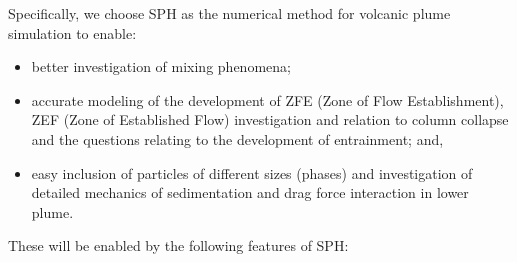 \documentclass[journal abbreviation, manuscript]{copernicus}
\begin{document}
Specifically, we choose SPH as the numerical method for volcanic plume simulation to enable:
\begin{itemize}
\item better investigation of mixing phenomena;
\item accurate modeling of the development of ZFE (Zone of Flow Establishment), ZEF (Zone of Established Flow) investigation and relation to column collapse and the questions relating to the development of entrainment; %
and,
\item  easy inclusion of particles of different sizes (phases) and investigation of detailed mechanics of sedimentation and drag force interaction in lower plume.
\end{itemize}
These  will be enabled by the following features of SPH:
\end{document}

